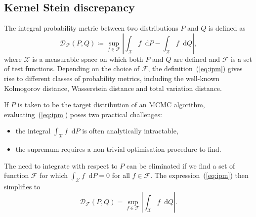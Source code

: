 \documentclass[12pt,a4paper]{report}
\newcommand*\diff{\mathop{}\!\mathrm{d}}
\begin{document}
\subsection{Kernel Stein discrepancy}

The integral probability metric between two distributions $P$ and $Q$ is defined as
\begin{equation}
\mathcal{D}_{\mathcal{F}}(P, Q) \coloneq \sup_{f \in \mathcal{F}}\left|\int_\mathcal{X} f \diff P - \int_\mathcal{X} f \diff Q \right|,
\label{eq:ipm}
\end{equation}
where $\mathcal{X}$ is a measurable space on which both $P$ and $Q$ are defined and $\mathcal{F}$ is a set of test functions. Depending on the choice of $\mathcal{F}$, the definition~(\ref{eq:ipm}) gives rise to different classes of probability metrics, including the well-known Kolmogorov distance, Wasserstein distance and total variation distance.

If $P$ is taken to be the target distribution of an MCMC algorithm, evaluating~(\ref{eq:ipm}) poses two practical challenges:
\begin{itemize}
\item the integral $\int_\mathcal{X} f \diff P$ is often analytically intractable,
\item the supremum requires a non-trivial optimisation procedure to find.
\end{itemize}

The need to integrate with respect to $P$ can be eliminated if we find a set of function $\mathcal{F}$ for which $\int_\mathcal{X} f \diff P = 0$ for all $f \in \mathcal{F}$. The expression~(\ref{eq:ipm}) then simplifies to
\begin{equation}
\mathcal{D}_{\mathcal{F}}(P, Q) = \sup_{f \in \mathcal{F}}\left|\int_\mathcal{X} f \diff Q \right|.
\label{eq:stein-discrepancy-sup}
\end{equation}

\end{document}
